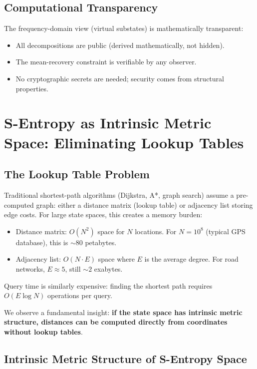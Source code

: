 \documentclass[twocolumn,11pt,a4paper]{article}
\begin{document}
\subsection{Computational Transparency}

The frequency-domain view (virtual substates) is mathematically transparent:
\begin{itemize}[nosep,leftmargin=1em]
  \item All decompositions are public (derived mathematically, not hidden).
  \item The mean-recovery constraint is verifiable by any observer.
  \item No cryptographic secrets are needed; security comes from structural properties.
\end{itemize}

\section{S-Entropy as Intrinsic Metric Space: Eliminating Lookup Tables}
\label{sec:intrinsic_metric}

\subsection{The Lookup Table Problem}

Traditional shortest-path algorithms (Dijkstra, A*, graph search) assume a pre-computed graph: either a distance matrix (lookup table) or adjacency list storing edge costs. For large state spaces, this creates a memory burden:

\begin{itemize}[nosep,leftmargin=1em]
  \item Distance matrix: $O(N^2)$ space for $N$ locations. For $N=10^8$ (typical GPS database), this is $\sim 80$ petabytes.
  \item Adjacency list: $O(N \cdot E)$ space where $E$ is the average degree. For road networks, $E \approx 5$, still $\sim 2$ exabytes.
\end{itemize}

Query time is similarly expensive: finding the shortest path requires $O(E \log N)$ operations per query.

We observe a fundamental insight: \textbf{if the state space has intrinsic metric structure, distances can be computed directly from coordinates without lookup tables}.

\subsection{Intrinsic Metric Structure of S-Entropy Space}
\end{document}

